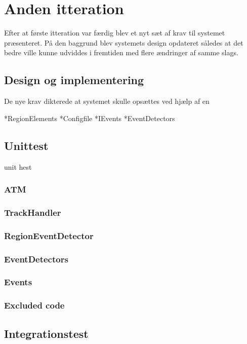 \thispagestyle{fancy}
\chapter{Anden itteration}
\label{chp:seconditteration}
Efter at første itteration var færdig blev et nyt sæt af krav til systemet præsenteret. På den baggrund blev systemets design opdateret således at det bedre ville kunne udviddes i fremtiden med flere ændringer af samme slags. 

\section{Design og implementering}
De nye krav dikterede at systemet skulle opsættes ved hjælp af en 


*RegionElements
*Configfile
*IEvents
*EventDetectors


\section{Unittest}
unit hest
\subsection{ATM}
\subsection{TrackHandler}
\subsection{RegionEventDetector}
\subsection{EventDetectors}
\subsection{Events}
\subsection{Excluded code}
\section{Integrationstest}


